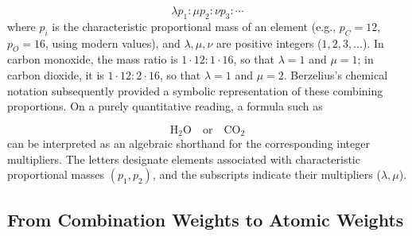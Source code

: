 \documentclass[submitted,12pt]{article}
\begin{document}
\begin{equation*}
\lambda p_1 : \mu p_2 : \nu p_3 : \cdots
\end{equation*}
%
where $p_i$ is the characteristic proportional mass of an element (e.g., $p_C=12$, $p_O=16$, using modern values), and $\lambda, \mu, \nu$ are positive integers ($1, 2, 3, \ldots$). In carbon monoxide, the mass ratio is $1 \cdot 12 : 1 \cdot 16$, so that $\lambda=1$ and $\mu=1$; in carbon dioxide, it is $1 \cdot 12 : 2 \cdot 16$, so that $\lambda=1$ and $\mu=2$. Berzelius's chemical notation subsequently provided a symbolic representation of these combining proportions. On a purely quantitative reading, a formula such as

\begin{equation*}
\mathrm{H}_2\mathrm{O} \quad \text{or} \quad \mathrm{CO}_2
\end{equation*}
%
can be interpreted as an algebraic shorthand for the corresponding integer multipliers. The letters designate elements associated with characteristic proportional masses $\left(p_1, p_2\right)$, and the subscripts indicate their multipliers ($\lambda, \mu$).

\subsection{From Combination Weights to Atomic Weights}
\end{document}
